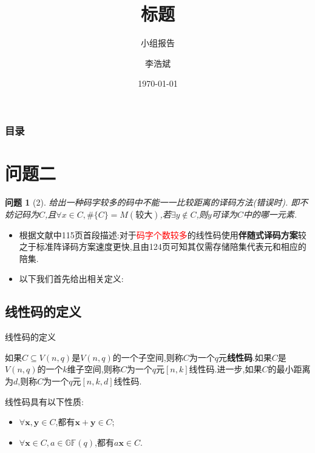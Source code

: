 \documentclass{beamer}
\title[标题]{标题}
\subtitle{小组报告} %
\author[数学与统计学院]{李浩斌}
\institute[信阳师范大学]{信息与计算科学}
\date[\today] %
{\today}
\newtheorem{question}{问题}
\begin{document}
	\frame{\titlepage}
	
	\begin{frame}
	\frametitle{目录}
		\tableofcontents
	\end{frame}

	\section{问题二}
	\begin{frame}
		\begin{question}[2]
		\qquad 给出一种码字较多的码中不能一一比较距离的译码方法(错误时).
		即不妨记码为$C$,且$\forall x\in C,\#\{C\}=M(\text{较大})$,若$\exists y\notin C$,则$y$可译为$C$中的哪一元素.
		\end{question}
		
		\quad
		
		\begin{itemize}
			\item 根据文献\cite{陈鲁生2005}中115页首段描述:对于\textcolor{red}{码字个数较多}的线性码使用\textbf{伴随式译码方案}较之于标准阵译码方案速度更快,且由124页可知其仅需存储陪集代表元和相应的陪集.
			\item 以下我们首先给出相关定义:
		\end{itemize}
	\end{frame}
	\subsection{线性码的定义}
	\begin{frame}{线性码的定义}
		\begin{definition}
		\quad \quad 如果$C\subseteq V(n,q)$是$V(n,q)$的一个子空间,则称$C$为一个$q$元\textbf{线性码}\cite{陈鲁生2005}.如果$C$是$V(n,q)$的一个$k$维子空间,则称$C$为一个$q$元$[n,k]$线性码.进一步,如果$C$的最小距离为$d$,则称$C$为一个$q$元$[n,k,d]$线性码.
		\end{definition}
		
		\quad
		
		\noindent 线性码具有以下性质:
		\begin{itemize}
			\item $\forall \mathbf{x},\mathbf{y}\in C$,都有$\mathbf{x}+\mathbf{y}\in C$;
			\item $\forall \mathbf{x}\in C,a\in \mathbb{GF}(q)$,都有$a \mathbf{x}\in C$.
		\end{itemize}
	\end{frame}
\end{document}
